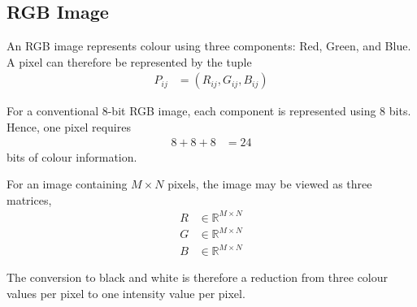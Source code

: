 \subsection{RGB Image}

An RGB image represents colour using three components: Red, Green, and
Blue. A pixel can therefore be represented by the tuple
\begin{align}
P_{ij} &= (R_{ij},G_{ij},B_{ij})\label{eq:rgb_pixel}
\end{align}

For a conventional 8-bit RGB image, each component is represented using
8 bits. Hence, one pixel requires
\begin{align}
8+8+8 &= 24\label{eq:rgb_bits}
\end{align}
bits of colour information.

For an image containing $M\times N$ pixels, the image may be viewed as
three matrices,
\begin{align}
R&\in\mathbb{R}^{M\times N}\label{eq:r_matrix}\\
G&\in\mathbb{R}^{M\times N}\label{eq:g_matrix}\\
B&\in\mathbb{R}^{M\times N}\label{eq:b_matrix}
\end{align}

The conversion to black and white is therefore a reduction from three
colour values per pixel to one intensity value per pixel.
